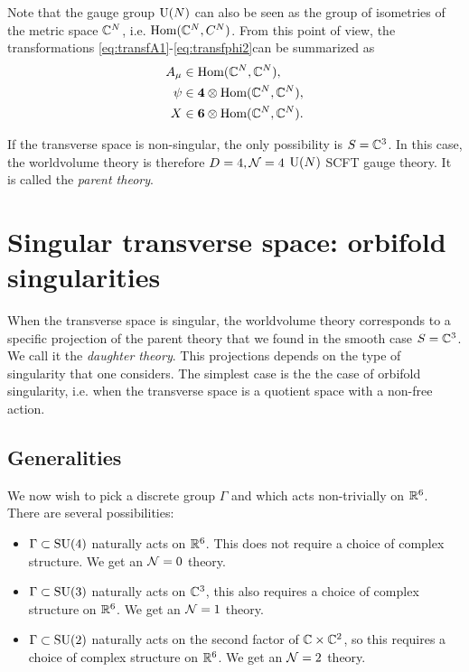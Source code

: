         Note that the gauge group $\text{U}(N)$ can also be seen as the group of isometries of the metric space $\mathbb{C}^N$, i.e. $\text{Hom}(\mathbb{C}^N,C^N)$. From this point of view, the transformations \eqref{eq:transfA1}-\eqref{eq:transfphi2}can be summarized as
        \begin{align}
            A_\mu&\in\text{Hom}(\mathbb{C}^N,\mathbb{C}^N),\label{eq:AHom}\\
            \psi&\in\boldsymbol{4}\otimes\text{Hom}(\mathbb{C}^N,\mathbb{C}^N),\label{eq:psiHom}\\
            X&\in\boldsymbol{6}\otimes\text{Hom}(\mathbb{C}^N,\mathbb{C}^N).\label{eq:phiHom}
        \end{align}

        \begin{result}
            If the transverse space is non-singular, the only possibility is $S=\mathbb{C}^3$. In this case, the worldvolume theory is therefore $D=4,\mathcal{N}=4$ $\text{U}(N)$ SCFT gauge theory. It is called the \emph{parent theory}.
        \end{result}

\section{Singular transverse space: orbifold singularities}

    When the transverse space is singular, the worldvolume theory corresponds to a specific projection of the parent theory that we found in the smooth case $S=\mathbb{C}^3$. We call it the \emph{daughter theory}. This projections depends on the type of singularity that one considers. The simplest case is the the case of orbifold singularity, i.e. when the transverse space is a quotient space with a non-free action.

    \subsection{Generalities}

        We now wish to pick a discrete group $\Gamma$ and which acts non-trivially on $\mathbb{R}^6$. There are several possibilities:
        \begin{itemize}
            \item $\Gamma\subset\text{SU}(4)$ naturally acts on $\mathbb{R}^6$. This does not require a choice of complex structure. We get an $\mathcal{N}=0$ theory.
            \item $\Gamma\subset\text{SU}(3)$ naturally acts on $\mathbb{C}^3$, this also requires a choice of complex structure on $\mathbb{R}^6$. We get an $\mathcal{N}=1$ theory.
            \item $\Gamma\subset\text{SU}(2)$ naturally acts on the second factor of $\mathbb{C}\times\mathbb{C}^2$, so this requires a choice of complex structure on $\mathbb{R}^6$. We get an $\mathcal{N}=2$ theory.
        \end{itemize}

